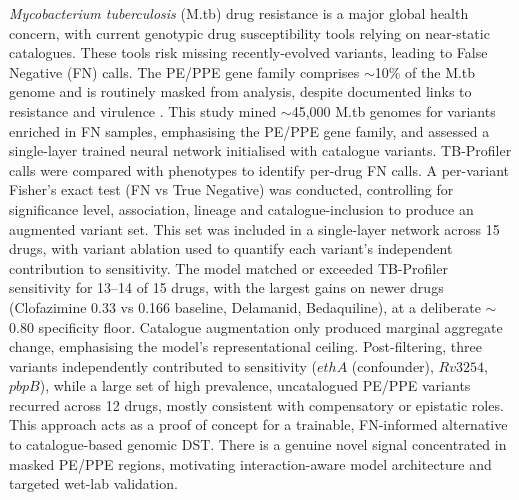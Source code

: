 \textit{Mycobacterium tuberculosis} (M.tb) drug resistance is a major global health concern, with current genotypic drug susceptibility tools relying on near-static catalogues. These tools risk missing recently-evolved variants, leading to False Negative (FN) calls. The PE/PPE gene family comprises $\sim$10\% of the M.tb genome and is routinely masked from analysis, despite documented links to resistance and virulence \cite{marin2022benchmarking, modlin2021exact, dejesus2017comprehensive, d2023pe}. This study mined $\sim$45,000 M.tb genomes for variants enriched in FN samples, emphasising the PE/PPE gene family, and assessed a single-layer trained neural network initialised with catalogue variants. TB-Profiler \cite{phelan2019integrating} calls were compared with phenotypes to identify per-drug FN calls. A per-variant Fisher's exact test (FN vs True Negative) was conducted, controlling for significance level, association, lineage and catalogue-inclusion to produce an augmented variant set. This set was included in a single-layer network across 15 drugs, with variant ablation used to quantify each variant's independent contribution to sensitivity. The model matched or exceeded TB-Profiler sensitivity for 13--14 of 15 drugs, with the largest gains on newer drugs (Clofazimine 0.33 vs 0.166 baseline, Delamanid, Bedaquiline), at a deliberate $\sim$0.80 specificity floor. Catalogue augmentation only produced marginal aggregate change, emphasising the model's representational ceiling. Post-filtering, three variants independently contributed to sensitivity ($ethA$ (confounder), $Rv3254$, $pbpB$), while a large set of high prevalence, uncatalogued PE/PPE variants recurred across 12 drugs, mostly consistent with compensatory or epistatic roles. This approach acts as a proof of concept for a trainable, FN-informed alternative to catalogue-based genomic DST. There is a genuine novel signal concentrated in masked PE/PPE regions, motivating interaction-aware model architecture and targeted wet-lab validation.
